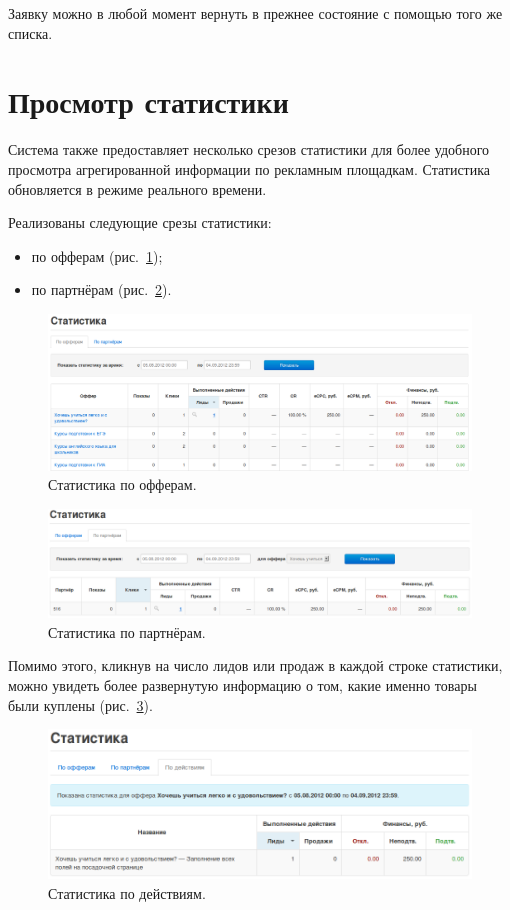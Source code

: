 \documentclass[a4paper,12pt]{article}
\begin{document}
Заявку можно в любой момент вернуть в прежнее состояние с помощью того же списка.

\section{Просмотр статистики}

Система \heymoose{} также предоставляет несколько срезов статистики для более удобного просмотра агрегированной информации по рекламным площадкам. Статистика обновляется в режиме реального времени.

Реализованы следующие срезы статистики:

\begin{itemize}
\item по офферам (рис.~\ref{fig:stats-offer});
\item по партнёрам (рис.~\ref{fig:stats-aff}).
\end{itemize}

\begin{figure}[!ht]
\centering
\includegraphics[width=\textwidth]{include/stats-offer.png}
\caption{Статистика по офферам.}
\label{fig:stats-offer}
\end{figure}

\begin{figure}[!ht]
\centering
\includegraphics[width=\textwidth]{include/stats-aff.png}
\caption{Статистика по партнёрам.}
\label{fig:stats-aff}
\end{figure}

Помимо этого, кликнув на число лидов или продаж в каждой строке статистики, можно увидеть более развернутую информацию о том, какие именно товары были куплены (рис.~\ref{fig:stats-suboffer}).

\begin{figure}[!ht]
\centering
\includegraphics[width=\textwidth]{include/stats-suboffer.png}
\caption{Статистика по действиям.}
\label{fig:stats-suboffer}
\end{figure}
\end{document}
